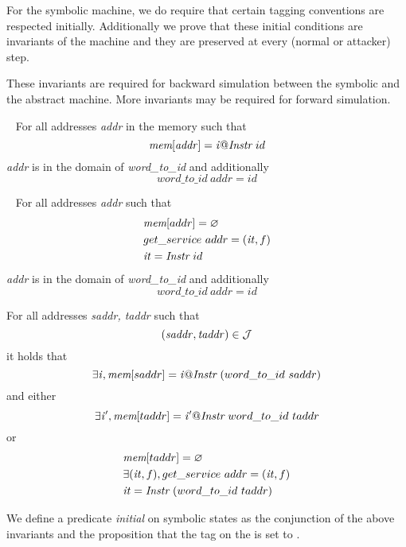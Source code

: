 For the symbolic machine, we do require that certain tagging
conventions are respected initially. Additionally we prove that
these initial conditions are invariants of the machine and they
are preserved at every (normal or attacker) step.

These invariants are required for backward simulation between
the symbolic and the abstract machine. More invariants may
be required for forward simulation.


\begin{definition}\label{definition:instructions_tagged}
  ~ For all addresses \textit{addr} in the memory such that
  $$\textit{mem}[\mathit{addr}] = \mathit{i}@\textit{Instr}~id$$ \textit{addr}
  is in the domain of \emph{word\_to\_id} and additionally
  $$word\_to\_id ~\mathit{addr} = \mathit{id}$$
\end{definition}

\begin{definition}\label{definition:entry_tagged}
  ~ For all addresses \textit{addr} such that 
  \begin{align*}
  & \textit{mem}[addr] = \varnothing\\
  & get\_service~addr = (\mathit{it},f)\\
  & \mathit{it} = \textit{Instr}~id
  \end{align*}
  \textit{addr} is in the domain of \emph{word\_to\_id} and additionally
  $$word\_to\_id ~\mathit{addr} = \mathit{id}$$
\end{definition}

\begin{definition}\label{definition:valid_jmp_tagged}
  For all addresses \textit{saddr, taddr} such that
  $$(\mathit{saddr},\mathit{taddr}) \in \mathcal{J}$$ it holds that
  $$\exists \mathit{i}, \textit{mem}[saddr] = \mathit{i}@\textit{Instr}~(word\_to\_id~saddr) $$
  and either $$\exists \mathit{i'}, \textit{mem}[taddr]
  =\mathit{i'}@\textit{Instr}~word\_to\_id~taddr$$ or
  \begin{align*}
  & \textit{mem}[taddr] = \varnothing\\ 
  & \exists (\mathit{it},f), get\_service~addr = (\mathit{it},f)\\
  & \mathit{it} = \textit{Instr}~(word\_to\_id~taddr)
  \end{align*}
\end{definition}

We define a predicate \emph{initial} on symbolic states as
the conjunction of the above invariants and the
proposition that the tag on the \pc is set to \DATAname.

